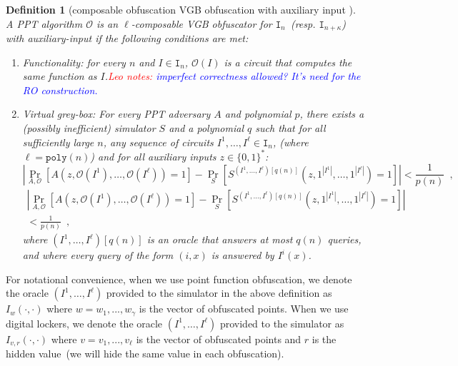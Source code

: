 \documentclass[11pt]{article}
\newtheorem{definition}[theorem]{Definition}
\newcommand{\consref}[1]{\mbox{Construction~\ref{#1}}}
\newcommand{\zo}{\ensuremath{\{0, 1\}}}
\newcommand{\poly}{\ensuremath{\mathtt{poly}}\xspace}
\newcommand{\authnote}[2]{{\textcolor{red}{\textsf{#1 notes: }\textcolor{blue}{ #2}}\marginpar{\textcolor{red}{\textbf{!!!!!}}}}}
\newcommand{\authnote}[2]{}
\newcommand{\lnote}[1]{{\authnote{Leo}{#1}}}
\begin{document}
\begin{definition}[composable obfuscation VGB obfuscation with auxiliary input \cite{bitansky2010strong}]
\label{def:obf} A PPT algorithm $\mathcal{O}$ is an $\ell$-composable VGB obfuscator for $\mathtt{I}_{n}$~(resp. $\mathtt{I}_{n+\kappa}$) with auxiliary-input if the following conditions are met:
\begin{enumerate}
\item \emph{Functionality:} for every $n$ and $I \in \mathtt{I}_n$, $\mathcal{O}(I)$ is a circuit that computes the same function as $I$.\lnote{imperfect correctness allowed? It's need for the RO construction.}
\item \emph{Virtual grey-box:}  For every PPT adversary $A$ and polynomial $p$, there exists a (possibly inefficient) simulator $S$ and a polynomial $q$ such that for all sufficiently large $n$, any  sequence of circuits $I^1,\dots,I^\ell \in \mathtt{I}_n$, (where $\ell=\poly(n)$) and for all auxiliary inputs $z\in \zo^*$:
\ifnum{}
\[
|\Pr_{A,\mathcal{O}}[A(z,\mathcal{O}(I^1),\dots,\mathcal{O}(I^\ell)) = 1] - \Pr_{S}[S^{(I^1,\dots,I^\ell)[q(n)]}(z, 1^{|I^1|},\dots,1^{|I^\ell|}) = 1] | < \frac{1}{p(n)} \enspace,
\]
\else
\begin{align*}
|\Pr_{A,\mathcal{O}}[A(z,\mathcal{O}(I^1),\dots,\mathcal{O}(I^\ell)) = 1]   - \Pr_{S}[S^{(I^1,\dots,I^\ell)[q(n)]}(z, 1^{|I^1|},\dots,1^{|I^\ell|}) = 1] | \\ < \frac{1}{p(n)} \enspace,
\end{align*}
\fi
where $(I^1,\dots,I^\ell)[q(n)]$ is an oracle that answers at most $q(n)$ queries, and where every query of the form $(i,x)$ is answered by $I^i(x)$.
\end{enumerate}
\end{definition}
For notational convenience, when we use point function obfuscation, we denote the oracle $(I^1,\dots,I^\ell)$ provided to the simulator in the above definition as $I_w(\cdot, \cdot)$ where $w = w_1,..., w_\gamma$ is the vector of obfuscated points.  When we use digital lockers, we denote the oracle  $(I^1,\dots,I^\ell)$ provided to the simulator as $I_{v, r}(\cdot, \cdot)$ where $v = v_1,..., v_\ell$ is the vector of obfuscated points and $r$ is the hidden value~(we will hide the same value in each obfuscation). 

\end{document}
